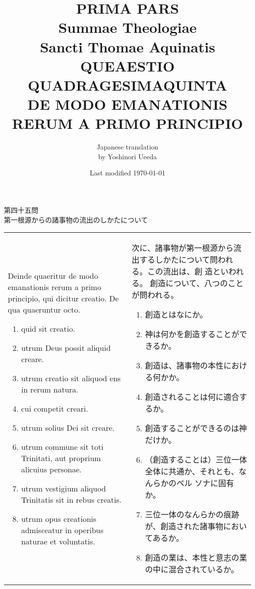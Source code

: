 \documentclass[10pt]{jsarticle} %
\title{{\bf PRIMA PARS}\\{\HUGE Summae Theologiae}\\Sancti Thomae
Aquinatis\\{\sffamily QUEAESTIO QUADRAGESIMAQUINTA}\\DE MODO
EMANATIONIS RERUM A PRIMO PRINCIPIO}
\author{Japanese translation\\by Yoshinori {\sc Ueeda}}
\date{Last modified \today}
\begin{document}
\maketitle

\begin{center}
{\Large 第四十五問\\第一根源からの諸事物の流出のしかたについて}
\end{center}

\begin{longtable}{p{21em}p{21em}}

Deinde quaeritur de modo emanationis rerum a primo principio, qui
 dicitur creatio. De qua quaeruntur octo.
\begin{enumerate}
 \item quid sit creatio.
 \item utrum Deus possit aliquid creare.
 \item utrum creatio sit aliquod ens in rerum natura.
 \item cui competit creari.
 \item utrum solius Dei sit creare.
 \item utrum commune sit toti Trinitati, aut proprium alicuius personae.
 \item utrum vestigium aliquod Trinitatis sit in rebus creatis.
 \item utrum opus creationis admisceatur in operibus naturae et voluntatis.
\end{enumerate}


&

次に、諸事物が第一根源から流出するしかたについて問われる。この流出は、創
 造といわれる。
創造について、八つのことが問われる。
\begin{enumerate}
 \item 創造とはなにか。
 \item 神は何かを創造することができるか。
 \item 創造は、諸事物の本性における何かか。
 \item 創造されることは何に適合するか。
 \item 創造することができるのは神だけか。
 \item （創造することは）三位一体全体に共通か、それとも、なんらかのペル
       ソナに固有か。
 \item 三位一体のなんらかの痕跡が、創造された諸事物においてあるか。
 \item 創造の業は、本性と意志の業の中に混合されているか。
\end{enumerate}


\end{longtable}
\end{document}
